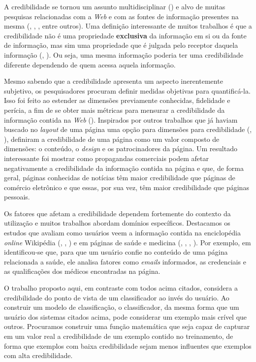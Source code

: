 A credibilidade se tornou um assunto multidisciplinar (\cite{Rieh07}) e alvo de muitas pesquisas relacionadas com a \textit{Web} e com as fontes de informação presentes na mesma (\cite{Sundar99}, \cite{Freeman04}, \cite{Flanagin07}, entre outros).
Uma definição interessante de muitos trabalhos é que a credibilidade não é uma propriedade \textbf{exclusiva} da informação em si ou da fonte de informação, mas sim uma propriedade que é julgada pelo receptor daquela informação (\cite{Sundar99}, \cite{Freeman04}). Ou seja, uma mesma informação poderia ter uma credibilidade diferente dependendo de quem acessa aquela informação.

Mesmo sabendo que a credibilidade apresenta um aspecto inerentemente subjetivo, os pesquisadores procuram definir medidas objetivas para quantificá-la. Isso foi feito ao estender as dimensões previamente conhecidas, fidelidade e perícia, a fim de se obter mais métricas para mensurar a credibilidade da informação contida na \textit{Web} (\cite{Flanagin07}).
Inspirados por outros trabalhos que já haviam buscado no \textit{layout} de uma página uma opção para dimensões para credibilidade
 (\cite{Palmer00}, \cite{Fogg01}), \cite{Flanagin07} definiram a credibilidade de uma página como um valor composto de dimensões: o conteúdo, o \textit{design} e os patrocinadores da página. Um resultado interessante foi mostrar como propagandas comerciais podem afetar negativamente a credibilidade da informação contida na página e que, de forma geral, páginas conhecidas de notícias têm maior credibilidade que páginas de comércio eletrônico e que essas, por sua vez, têm maior credibilidade que páginas pessoais.

Os fatores que afetam a credibilidade dependem fortemente do contexto da utilização e muitos trabalhos abordam domínios específicos.
Destacamos os estudos que avaliam como usuários veem a informação contida na enciclopédia \textit{online} Wikipédia (\cite{Chesney06}, \cite{Lopes08}, \cite{Kubiszewski11}) e em páginas de saúde e medicina (\cite{Linderg98}, \cite{Eastin01}, \cite{Eysenbach02}, \cite{Rains09}). Por exemplo, em \cite{Eysenbach02}
identificou-se que, para que um usuário confie no conteúdo de uma página relacionada a saúde, ele analisa fatores como \textit{emails} informados, as credenciais e as qualificações dos médicos encontradas na página.

O trabalho proposto aqui, em contraste com todos acima citados, considera a credibilidade do ponto de vista de um classificador ao invés do usuário. Ao construir um modelo de classificação, o classificador, da mesma forma que um usuário dos sistemas citados acima, pode considerar um exemplo mais crível que outros. Procuramos construir uma função matemática que seja capaz de capturar em um valor real a credibilidade de um exemplo contido no treinamento, de forma que exemplos com baixa credibilidade sejam menos influentes que exemplos com alta credibilidade.

